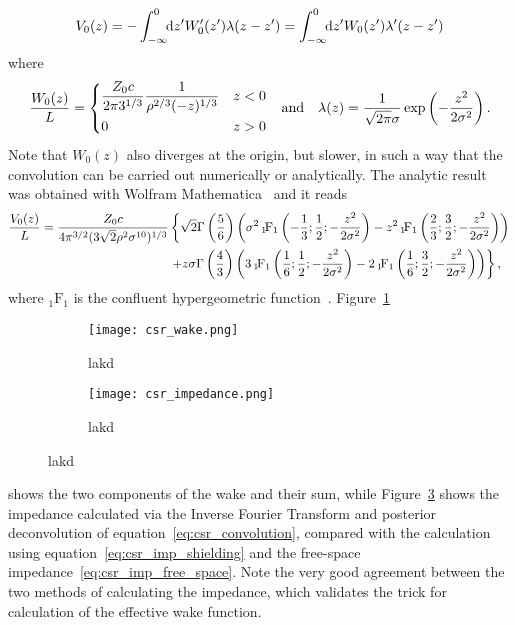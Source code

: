     \begin{align}\label{eq:csr_convolution}
        V_0(z) = -\defint{z'}{W'_0(z')\lambda(z-z')}{-\infty}{0} = \defint{z'}{W_0(z')\lambda'(z-z')}{-\infty}{0}
    \end{align}
    where
    \begin{align}
        \frac{W_0(z)}{L} =
        \begin{dcases}
            \frac{Z_0 c}{2 \pi 3^{1/3}} \frac{1}{\rho^{2/3}(-z)^{1/3}} & z<0\\
            0 & z>0
        \end{dcases}& &\text{and} &&\lambda(z) = \frac{1}{\sqrt{2\pi}\sigma}\exp\fof{-\frac{z^2}{2\sigma^2}}.
    \end{align}
    Note that $W_0(z)$ also diverges at the origin, but slower, in such a way that the convolution can be carried out numerically or analytically. The analytic result was obtained with Wolfram Mathematica~\cite{WolframResearchInc.2016} and it reads
    \begin{align}\nonumber
        \frac{V_0(z)}{L} =
        \frac{Z_0 c}{4\pi^{3/2}(3\sqrt{2}\rho^2\sigma^{10})^{1/3}}
        &\left\{
            \sqrt{2}\Gamma\fof{\frac56}
            \fof{
                \sigma^2\pFq{-\frac13}{\frac12}{-\frac{z^2}{2\sigma^2}} -
                      z^2\pFq{\frac23}{\frac32}{-\frac{z^2}{2\sigma^2}}
                }\right. \\\nonumber
        &   \left.+ z\sigma\Gamma\fof{\frac43}
            \fof{
                 3\pFq{\frac16}{\frac12}{-\frac{z^2}{2\sigma^2}} -
                 2\pFq{\frac16}{\frac32}{-\frac{z^2}{2\sigma^2}}}\right\},
    \end{align}
    where ${}_1\!\text{F}_1$ is the confluent hypergeometric function~\cite{wiki2017b}.
    Figure~\ref{fig:csr_wake}
    \begin{figure}
        \centering
        \begin{subfigure}[c]{0.48\textwidth}
            \centering
            \texttt{[image: csr\_wake.png]}
            \caption{lakd}
            \label{fig:csr_wake}
        \end{subfigure}\hfill
        \begin{subfigure}[c]{0.48\textwidth}
            \centering
            \texttt{[image: csr\_impedance.png]}
            \caption{lakd}
            \label{fig:csr_impedance}
        \end{subfigure}
    \end{figure}
    shows the two components of the wake and their sum, while Figure~\ref{fig:csr_impedance} shows the impedance calculated via the Inverse Fourier Transform and posterior deconvolution of equation~\eqref{eq:csr_convolution}, compared with the calculation using equation~\eqref{eq:csr_imp_shielding} and the free-space impedance~\eqref{eq:csr_imp_free_space}. Note the very good agreement between the two methods of calculating the impedance, which validates the trick for calculation of the effective wake function.

